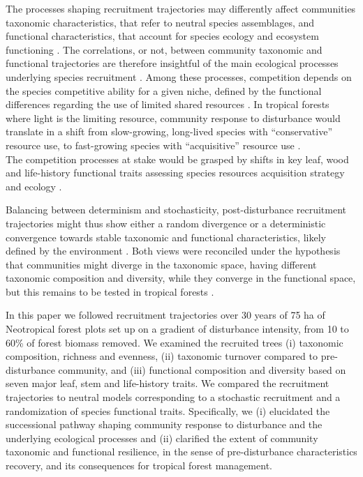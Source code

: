 \documentclass[
  11pt,
  french,
  A4paper,
  extrafontsizes,onecolumn,openright
  ]{memoir}
\begin{document}
The processes shaping recruitment trajectories may differently affect
communities taxonomic characteristics, that refer to neutral species
assemblages, and functional characteristics, that account for species
ecology and ecosystem functioning \autocites{Violle2007b}{Kunstler2016}.
The correlations, or not, between community taxonomic and functional
trajectories are therefore insightful of the main ecological processes
underlying species recruitment \autocite{Fukami2005}. Among these
processes, competition depends on the species competitive ability for a
given niche, defined by the functional differences regarding the use of
limited shared resources \autocite{Perronne2017}. In tropical forests
where light is the limiting resource, community response to disturbance
would translate in a shift from slow-growing, long-lived species with
``conservative'' resource use, to fast-growing species with
``acquisitive'' resource use
\autocites{Denslow1980}{Molino2001}{Bongers2009}.\\
The competition processes at stake would be grasped by shifts in key
leaf, wood and life-history functional traits assessing species
resources acquisition strategy and ecology
\autocites{Wright2004}{Chave2009}{Herault2011}.

Balancing between determinism and stochasticity, post-disturbance
recruitment trajectories might thus show either a random divergence or a
deterministic convergence towards stable taxonomic and functional
characteristics, likely defined by the environment
\autocites{Clements1916}{Diamond1975}. Both views were reconciled under
the hypothesis that communities might diverge in the taxonomic space,
having different taxonomic composition and diversity, while they
converge in the functional space, but this remains to be tested in
tropical forests \autocites{Fukami2005}{Li2018}.

In this paper we followed recruitment trajectories over 30 years of 75
ha of Neotropical forest plots set up on a gradient of disturbance
intensity, from 10 to 60\% of forest biomass removed. We examined the
recruited trees (i) taxonomic composition, richness and evenness, (ii)
taxonomic turnover compared to pre-disturbance community, and (iii)
functional composition and diversity based on seven major leaf, stem and
life-history traits. We compared the recruitment trajectories to neutral
models corresponding to a stochastic recruitment and a randomization of
species functional traits. Specifically, we (i) elucidated the
successional pathway shaping community response to disturbance and the
underlying ecological processes and (ii) clarified the extent of
community taxonomic and functional resilience, in the sense of
pre-disturbance characteristics recovery, and its consequences for
tropical forest management.
\end{document}

